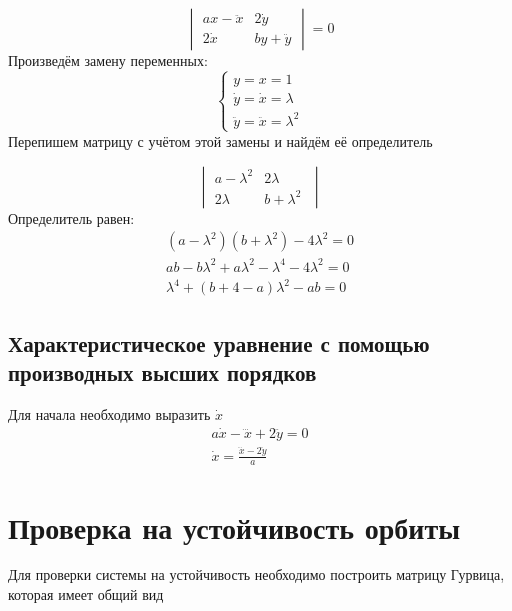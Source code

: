 \documentclass[12pt, a4paper]{article}
\begin{document}
\begin{displaymath}
    \begin{vmatrix}
        ax - \ddot x & 2 \dot y\\
        2 \dot x & by + \ddot y
    \end{vmatrix}
    = 0 
\end{displaymath}
Произведём замену переменных: 
\begin{displaymath}
    \begin{cases}
        y = x = 1 \\
        \dot y = \dot x = \lambda \\
        \ddot y = \ddot x = \lambda^2
    \end{cases}
\end{displaymath}
Перепишем матрицу с учётом этой замены и найдём её определитель

\begin{displaymath}
    \begin{vmatrix}
        a - \lambda^2 & 2 \lambda\;\\
        2 \lambda & b + \lambda^2\;
    \end{vmatrix}
\end{displaymath}
Определитель равен:
\begin{align*}
   (a - \lambda^2)(b + \lambda^2) - 4 \lambda^2 = 0\\
    ab - b \lambda^2 + a \lambda^2 - \lambda^4 - 4 \lambda^2 = 0\\
    \boxed{
    \lambda^4 + (b + 4 - a) \lambda^2 - ab = 0
    }
\end{align*}

\subsection{Характеристическое уравнение с помощью производных высших порядков}

Для начала необходимо выразить $\dot x$
\begin{gather*}
    a \dot x - \dddot x + 2 \ddot y = 0\\
    \dot x = \frac{\dddot x - 2 \ddot y}{a}
\end{gather*}
\section{Проверка на устойчивость орбиты}

Для проверки системы на устойчивость необходимо построить матрицу Гурвица, которая имеет общий вид
\end{document}
